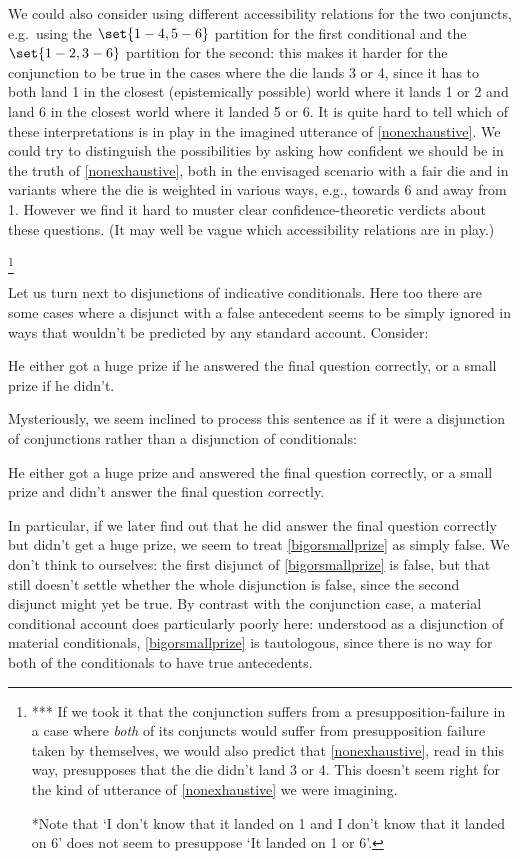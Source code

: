 \documentclass[If.tex]{subfiles}
\begin{document}
\begin{prop}
{	We could also consider using different accessibility relations for the two conjuncts, e.g.\ using the $\set{1-4,5-6}$ partition for the first conditional and the $\set{1-2,3-6}$ partition for the second: this makes it harder for the conjunction to be true in the cases where the die lands 3 or 4, since it has to both land 1 in the closest (epistemically possible) world where it lands 1 or 2 and land 6 in the closest world where it landed 5 or 6.  It is quite hard to tell which of these interpretations is in play in the imagined utterance of \ref{nonexhaustive}.  We could try to distinguish the possibilities by asking how confident we should be in the truth of \ref{nonexhaustive}, both in the envisaged scenario with a fair die and in variants where the die is weighted in various ways, e.g., towards 6 and away from 1.  However we find it hard to muster clear confidence-theoretic verdicts about these questions.  (It may well be vague which accessibility relations are in play.) }

%
\footnote{*** If we took it that the conjunction suffers from a presupposition-failure in a case where \emph{both} of its conjuncts would suffer from presupposition failure taken by themselves, we would also predict that \ref{nonexhaustive}, read in this way, presupposes that the die didn't land 3 or 4.  This doesn't seem right for the kind of utterance of \ref{nonexhaustive} we were imagining.  
	
	*Note that ‘I don't know that it landed on 1 and I don't know that it landed on 6’ does not seem to presuppose ‘It landed on 1 or 6’.
	}

Let us turn next to disjunctions of indicative conditionals.  Here too there are some cases where a disjunct with a false antecedent seems to be simply ignored in ways that wouldn't be predicted by any standard account.  Consider:
\begin{prop}
	\nitem \label{bigorsmallprize}
	He either got a huge prize if he answered the final question correctly, or a small prize if he didn't.  
\end{prop}
Mysteriously, we seem inclined to process this sentence as if it were a disjunction of conjunctions rather than a disjunction of conditionals:
\begin{prop}
	\nitem \label{prizedisjunction}
	He either got a huge prize and answered the final question correctly, or a small prize and didn't answer the final question correctly.  
\end{prop}
In particular, if we later find out that he did answer the final question correctly but didn't get a huge prize, we seem to treat \ref{bigorsmallprize} as simply false.  We don't think to ourselves: the first disjunct of \ref{bigorsmallprize} is false, but that still doesn't settle whether the whole disjunction is false, since the second disjunct might yet be true.  By contrast with the conjunction case, a material conditional account does particularly poorly here: understood as a disjunction of material conditionals, \ref{bigorsmallprize} is tautologous, since there is no way for both of the conditionals to have true antecedents.


\end{prop}
\end{document}
